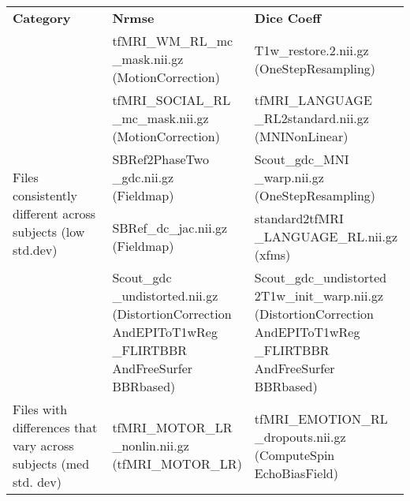 \iffalse
\begin{center}
\begin{longtable}{|p{}|p{}|p{}|}
\cline{1-3}
\textbf{Category} & \textbf{Nrmse} & \textbf{Dice Coeff} \\\cline{1-3}
\multirow{5}{.3\textwidth}{Files consistently different across subjects (low std.dev)}     & \makecell[l]{tfMRI\_WM\_RL\_mc\\\_mask.nii.gz \\ (MotionCorrection)}  & \makecell[l]{T1w\_restore.2.nii.gz\\(OneStepResampling)} \\\cline{2-3}
& \makecell[l]{tfMRI\_SOCIAL\_RL\\\_mc\_mask.nii.gz\\(MotionCorrection)}                   & \makecell[l]{tfMRI\_LANGUAGE\\\_RL2standard.nii.gz\\(MNINonLinear)} \\\cline{2-3}
& \makecell[l]{SBRef2PhaseTwo\\\_gdc.nii.gz\\(Fieldmap)}                        & \makecell[l]{Scout\_gdc\_MNI\\\_warp.nii.gz\\(OneStepResampling)} \\\cline{2-3}
& \makecell[l]{SBRef\_dc\_jac.nii.gz\\(Fieldmap)}                        & \makecell[l]{standard2tfMRI\\\_LANGUAGE\_RL.nii.gz\\(xfms)} \\\cline{2-3}
& \makecell[l]{Scout\_gdc\\\_undistorted.nii.gz\\(DistortionCorrection\\AndEPIToT1wReg\\\_FLIRTBBR\\AndFreeSurfer\\BBRbased)}                     & \makecell[l]{Scout\_gdc\_undistorted\\2T1w\_init\_warp.nii.gz\\(DistortionCorrection\\AndEPIToT1wReg\\\_FLIRTBBR\\AndFreeSurfer\\BBRbased)} \\\cline{1-3}
\multirow{5}{.3\textwidth}{Files with differences that vary across subjects (med std. dev)} & \makecell[l]{tfMRI\_MOTOR\_LR\\\_nonlin.nii.gz\\(tfMRI\_MOTOR\_LR)}  & \makecell[l]{tfMRI\_EMOTION\_RL\\\_dropouts.nii.gz\\(ComputeSpin\\EchoBiasField)} \\\cline{2-3}

\end{longtable}
\end{center}

